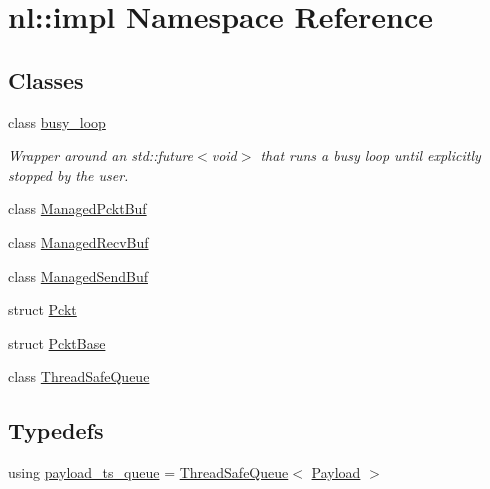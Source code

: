 \hypertarget{namespacenl_1_1impl}{}\section{nl\+:\+:impl Namespace Reference}
\label{namespacenl_1_1impl}
\subsection*{Classes}
\begin{DoxyCompactItemize}
\item 
class \hyperlink{classnl_1_1impl_1_1busy__loop}{busy\+\_\+loop}
\begin{DoxyCompactList}\small\item\em Wrapper around an {\ttfamily std\+::future$<$void$>$} that runs a busy loop until explicitly stopped by the user. \end{DoxyCompactList}\item 
class \hyperlink{classnl_1_1impl_1_1ManagedPcktBuf}{Managed\+Pckt\+Buf}
\item 
class \hyperlink{classnl_1_1impl_1_1ManagedRecvBuf}{Managed\+Recv\+Buf}
\item 
class \hyperlink{classnl_1_1impl_1_1ManagedSendBuf}{Managed\+Send\+Buf}
\item 
struct \hyperlink{structnl_1_1impl_1_1Pckt}{Pckt}
\item 
struct \hyperlink{structnl_1_1impl_1_1PcktBase}{Pckt\+Base}
\item 
class \hyperlink{classnl_1_1impl_1_1ThreadSafeQueue}{Thread\+Safe\+Queue}
\end{DoxyCompactItemize}
\subsection*{Typedefs}
\begin{DoxyCompactItemize}
\item 
using \hyperlink{namespacenl_1_1impl_ac6b1869f59942ec428df8880f4c20855}{payload\+\_\+ts\+\_\+queue} = \hyperlink{classnl_1_1impl_1_1ThreadSafeQueue}{Thread\+Safe\+Queue}$<$ \hyperlink{structnl_1_1Payload}{Payload} $>$
\end{DoxyCompactItemize}
